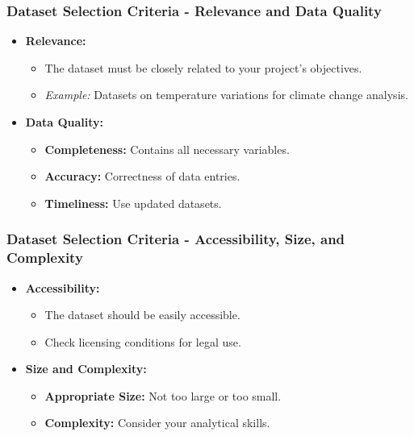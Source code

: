 \documentclass[aspectratio=169]{beamer}
\begin{document}
\begin{frame}[fragile]
    \frametitle{Dataset Selection Criteria - Relevance and Data Quality}
    \begin{itemize}
        \item \textbf{Relevance:}
        \begin{itemize}
            \item The dataset must be closely related to your project's objectives.
            \item \textit{Example:} Datasets on temperature variations for climate change analysis.
        \end{itemize}
        \item \textbf{Data Quality:}
        \begin{itemize}
            \item \textbf{Completeness:} Contains all necessary variables.
            \item \textbf{Accuracy:} Correctness of data entries.
            \item \textbf{Timeliness:} Use updated datasets.
        \end{itemize}
    \end{itemize}
\end{frame}

\begin{frame}[fragile]
    \frametitle{Dataset Selection Criteria - Accessibility, Size, and Complexity}
    \begin{itemize}
        \item \textbf{Accessibility:}
        \begin{itemize}
            \item The dataset should be easily accessible.
            \item Check licensing conditions for legal use.
        \end{itemize}
        \item \textbf{Size and Complexity:}
        \begin{itemize}
            \item \textbf{Appropriate Size:} Not too large or too small.
            \item \textbf{Complexity:} Consider your analytical skills.
        \end{itemize}
    \end{itemize}
\end{frame}
\end{document}
